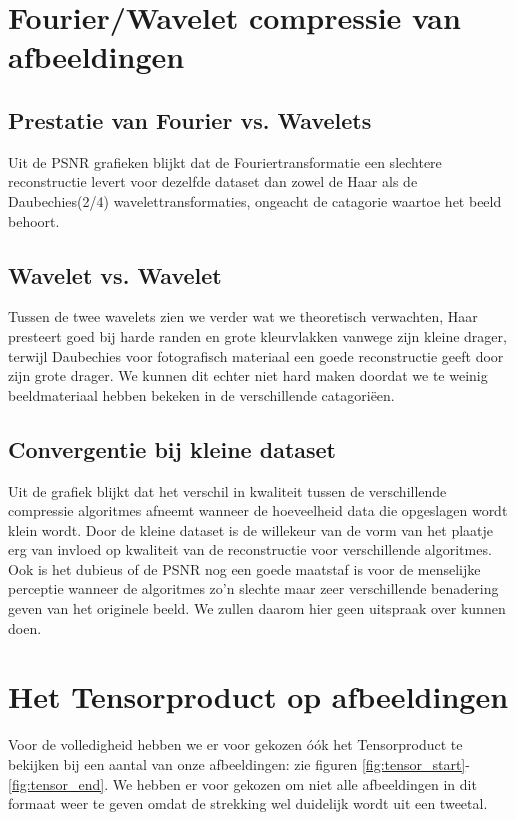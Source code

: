 \section{Fourier/Wavelet compressie van afbeeldingen}

\subsection{Prestatie van Fourier vs. Wavelets}
Uit de PSNR grafieken blijkt dat de Fouriertransformatie een slechtere reconstructie levert voor 
dezelfde dataset dan zowel de Haar als de Daubechies(2/4) wavelettransformaties, 
ongeacht de catagorie waartoe het beeld behoort.

\subsection{Wavelet vs. Wavelet}
Tussen de twee wavelets zien we verder wat we theoretisch verwachten, Haar presteert goed bij harde randen en grote kleurvlakken
vanwege zijn kleine drager, terwijl Daubechies voor fotografisch materiaal een goede reconstructie geeft door zijn grote drager.
We kunnen dit echter niet hard maken doordat we te weinig beeldmateriaal hebben bekeken in de verschillende catagori\"een. 

\subsection{Convergentie bij kleine dataset}
Uit de grafiek blijkt dat het verschil in kwaliteit tussen de verschillende compressie algoritmes afneemt wanneer
de hoeveelheid data die opgeslagen wordt klein wordt. 
Door de kleine dataset is de willekeur van de vorm van het plaatje erg van invloed op kwaliteit van de reconstructie 
voor verschillende algoritmes. 
Ook is het dubieus of de PSNR nog een goede maatstaf is voor de menselijke perceptie wanneer de algoritmes
zo'n slechte maar zeer verschillende benadering geven van het originele beeld.
We zullen daarom hier geen uitspraak over kunnen doen.

\section{Het Tensorproduct op afbeeldingen}
Voor de volledigheid hebben we er voor gekozen \'o\'ok het Tensorproduct te bekijken bij een aantal 
van onze afbeeldingen: zie figuren \ref{fig:tensor_start}-\ref{fig:tensor_end}. We hebben er voor 
gekozen om niet alle afbeeldingen in dit formaat weer te geven omdat de strekking wel duidelijk wordt 
uit een tweetal.

